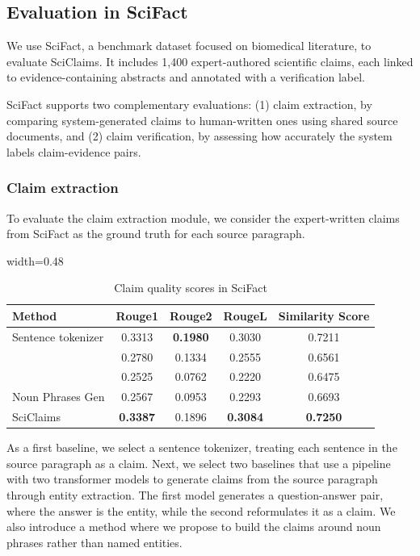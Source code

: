 \documentclass[11pt]{article}
\begin{document}
\subsection{Evaluation in SciFact}
\label{sec:scifact_eval}
We use SciFact, a benchmark dataset focused on biomedical literature, to evaluate SciClaims. It includes 1,400 expert-authored scientific claims, each linked to evidence-containing abstracts and annotated with a verification label. 

SciFact supports two complementary evaluations: (1) claim extraction, by comparing system-generated claims to human-written ones using shared source documents, and (2) claim verification, by assessing how accurately the system labels claim-evidence pairs.

\subsubsection{Claim extraction}
To evaluate the claim extraction module, we consider the expert-written claims from SciFact as the ground truth for each source paragraph.

\begin{table}[H]
\centering
\begin{adjustbox}{width=0.48\textwidth}
\begin{tabular}{ lcccc } 
 \hline
 Method & Rouge1 & Rouge2 & RougeL & Similarity Score \\ 
 \hline
 Sentence tokenizer & 0.3313 & \textbf{0.1980} & 0.3030 & 0.7211 \\ 
 \cite{pan-etal-2021-zero} & 0.2780 & 0.1334 & 0.2555 & 0.6561 \\ 
 \cite{wright-etal-2022-generating} & 0.2525 & 0.0762 & 0.2220 & 0.6475 \\ 
 \hline
 Noun Phrases Gen & 0.2567 & 0.0953 & 0.2293 & 0.6693 \\ 
 SciClaims & \textbf{0.3387} & 0.1896 & \textbf{0.3084} & \textbf{0.7250} \\
 \hline
\end{tabular}
\end{adjustbox}
\caption{Claim quality scores in SciFact} 
\label{table:cg_scores}
\end{table}

As a first baseline, we select a sentence tokenizer, treating each sentence in the source paragraph as a claim. Next, we select two baselines \cite{pan-etal-2021-zero, wright-etal-2022-generating} that use a pipeline with two transformer models to generate claims from the source paragraph through entity extraction. The first model generates a question-answer pair, where the answer is the entity, while the second reformulates it as a claim. We also introduce a method where we propose to build the claims around noun phrases rather than named entities.
\end{document}
